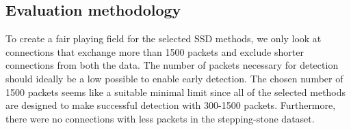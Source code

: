\documentclass[runningheads,11pt]{llncs}\usepackage[]{graphicx}\usepackage[]{color}
\begin{document}

\subsection{Evaluation methodology}



To create a fair playing field for the selected SSD methods, we only look at connections that exchange more than 1500 packets and exclude shorter connections from both the data.
The number of packets necessary for detection should ideally be a low possible to enable early detection. The chosen number of 1500 packets seems like a suitable minimal limit since all of the selected methods are designed to make successful detection with 300-1500 packets.  Furthermore, there were no connections with less packets in the stepping-stone dataset. %

\end{document}
